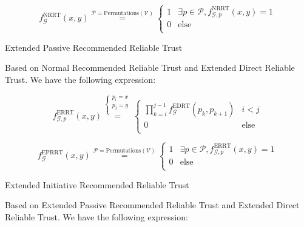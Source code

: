 \documentclass{article}
\begin{document}
\begin{equation}
f_{\mathcal{G}}^{\text{NRRT}}(x,y)\overset{\mathcal{P}=\text{Permutations}(\mathcal{V})}{=}\left\{
\begin{array}{cc}
 1 & \exists \mathit{p}\in \mathcal{P},f_{\mathcal{G},\mathit{p}}^{\text{NRRT}}(x,y)=1 \\
 0 & \text{else} \\
\end{array}
\right.
\end{equation}

Extended Passive Recommended Reliable Trust

Based on Normal Recommended Reliable Trust and Extended Direct Reliable Trust. We have the following expression:

\begin{equation}
f_{\mathcal{G},\mathit{p}}^{\text{ERRT}}(x,y)\overset{\left\{
\begin{array}{c}
 \mathit{p}_i=x \\
 \mathit{p}_j=y \\
\end{array}
\right.}{=}\left\{
\begin{array}{cc}
 \prod _{k=i}^{j-1} f_{\mathcal{G}}^{\text{EDRT}}\left(\mathit{p}_k,p_{k+1}\right) & i<j \\
 0 & \text{else} \\
\end{array}
\right.
\end{equation}

\begin{equation}
f_{\mathcal{G}}^{\text{EPRRT}}(x,y)\overset{\mathcal{P}=\text{Permutations}(\mathcal{V})}{=}\left\{
\begin{array}{cc}
 1 & \exists \mathit{p}\in \mathcal{P},f_{\mathcal{G},\mathit{p}}^{\text{ERRT}}(x,y)=1 \\
 0 & \text{else} \\
\end{array}
\right.
\end{equation}

Extended Initiative Recommended Reliable Trust

Based on Extended Passive Recommended Reliable Trust and Extended Direct Reliable Trust. We have the following expression:
\end{document}
